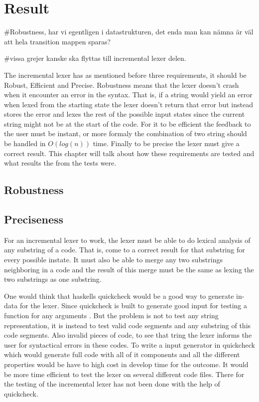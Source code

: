 \chapter{Result}
#Robustness, har vi egentligen i datastrukturen, det enda man kan nämna är väl att hela transition mappen sparas?

#vissa grejer kanske ska flyttas till incremental lexer delen.

The incremental lexer has as mentioned before three requirements, it should be
Robust, Efficient and Precise. Robustness means that the lexer doesn't crash
when it encounter an error in the syntax. That is, if a string would yield an
error when lexed from the starting state the lexer doesn't return that error but
instead stores the error and lexes the rest of the possible input states since
the current string might not be at the start of the code. For it to be efficient
the feedback to the user must be instant, or more formaly the combination of two
string should be handled in $O(log(n))$ time. Finally to be precise the lexer
must give a correct result. This chapter will talk about how these requirements
are tested and what results the from the tests were.

\section{Robustness}

\section{Preciseness}
For an incremental lexer to work, the lexer must be able to do lexical analysis
of any substring of a code. That is, come to a correct result for that substring
for every possible instate. It must also be able to merge any two substrings
neighboring in a code and the result of this merge must be the same as lexing
the two substrings as one substring.

One would think that haskells quickcheck would be a good way to generate in-data
for the lexer. Since quickcheck is built to generate good input for testing a
function for any arguments \cite{QuickCheck}. But the problem is not to test any
string representation, it is instead to test valid code segments and any
substring of this code segments. Also invalid pieces of code, to see that tring the
lexer informs the user for syntactical errors in these codes. To write a input
generator in quickcheck which would generate full code with all of it
components and all the different properties would be have to high cost in
develop time for the outcome. It would be more time efficient to test the lexer
on several different code files. There for the testing of the incremental lexer
has not been done with the help of quickcheck.

